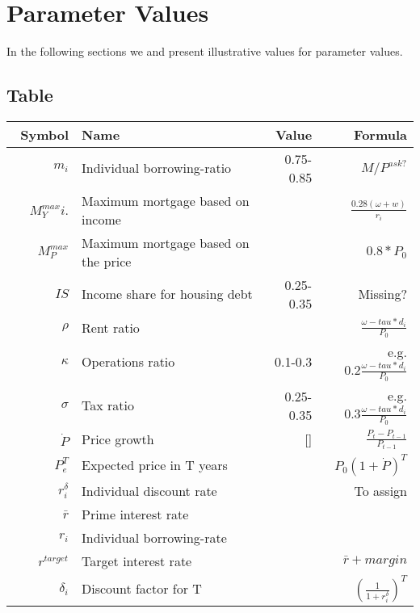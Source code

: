 







\chapter[Parameters]{Parameter Values}
\label{appendix-paremeters}

In the following sections we and present illustrative values for parameter values.

\section{Table}

\renewcommand{\arraystretch}{1.5}
\begin{tabular}{rlrr}\
Symbol         & Name                                 & Value      & Formula  \\ \hline
$m_i$          & Individual borrowing-ratio           & 0.75-0.85  & $M/P^{ask?}$ \\
$M^{max}_Yi$.  & Maximum mortgage based on income     &            & $\frac{0.28(\omega+w)}{r_i}$ \\
 $M^{max}_P$   & Maximum mortgage based on the price  &            & $0.8*P_0$ \\
$IS$           & Income share for housing debt        & 0.25-0.35  & Missing? \\
$\rho$         & Rent ratio                           &            & $\frac{\omega-tau*d_i}{P_0}$ \\
$\kappa $      & Operations ratio                     & 0.1-0.3    & e.g. $ 0.2\frac{\omega-tau*d_i}{P_0}$ \\
$\sigma$       & Tax ratio                            & 0.25-0.35  & e.g. $ 0.3\frac{\omega-tau*d_i}{P_0}$ \\
$\dot P $      & Price growth                         & []         & $\frac{P_t-P_{t-1}}{P_{t-1}}$\\
$P^T_e$        & Expected price in T years            &            & $P_0(1+\dot P)^T$ \\ %
$r_i^\delta$   & Individual discount rate             &            & To assign \\
$\bar r$       & Prime interest rate                  &            & \\
$r_i$          & Individual borrowing-rate            &            & \\
$r^{target}$   & Target interest rate                 &            & $\bar r + margin$ \\
$\delta_i$     & Discount factor for T                &            & $\left(\frac{1}{1+r_i^\delta}\right)^T$ \\
\end{tabular}
\renewcommand{\arraystretch}{1.0}


